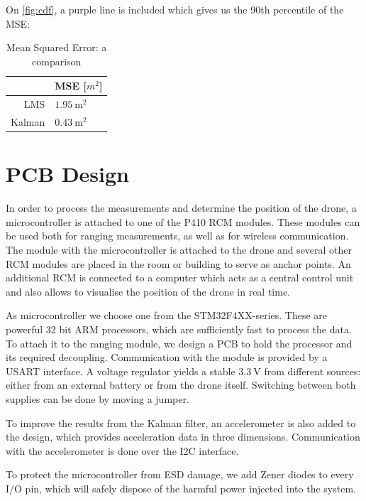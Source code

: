 \documentclass[a4paper]{article}        %
\begin{document}
On \autoref{fig:cdf}, a purple line is included which gives us the 90th percentile of the MSE:

\begin{table}[H]
\begin{center}
\begin{tabular}{ | r | l | }
    \hline
     & MSE [$m^2$] \\ \hline
    LMS & $\SI{1.95}{\square\meter}$ \\ \hline
    Kalman & $\SI{0.43}{\square\meter}$ \\
    \hline
\end{tabular}
\end{center}
\caption{Mean Squared Error: a comparison}
\label{table:MSE}
\end{table}

\section{PCB Design}
  In order to process the measurements and determine the position of the drone, a microcontroller is attached to one of the P410 RCM modules.
  These modules can be used both for ranging measurements, as well as for wireless communication. The module with the microcontroller is attached to the drone and several other RCM modules are placed in the room or building to serve as anchor points. An additional RCM is connected to a computer which acts as a central control unit and also allows to visualise the position of the drone in real time.

  As microcontroller we choose one from the STM32F4XX-series. These are powerful 32 bit ARM processors, which are sufficiently fast to process the data.
  To attach it to the ranging module, we design a PCB to hold the processor and its required decoupling. Communication with the module is provided by a USART interface.
  A voltage regulator yields a stable $\SI{3.3}{\volt}$ from different sources: either from an external battery or from the drone itself. Switching between both supplies can be done by moving a jumper.

  To improve the results from the Kalman filter, an accelerometer is also added to the design, which provides acceleration data in three dimensions. Communication with the accelerometer is done over the I2C interface.

  To protect the microcontroller from ESD damage, we add Zener diodes to every I/O pin, which will safely dispose of the harmful power injected into the system.
\end{document}
